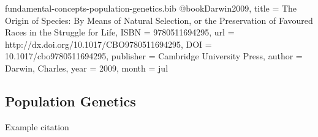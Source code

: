 \begin{bibunit}

\begin{filecontents*}[overwrite]{fundamental-concepts-population-genetics.bib}
@book{Darwin2009,
  title = {The Origin of Species: By Means of Natural Selection,  or the Preservation of Favoured Races in the Struggle for Life},
  ISBN = {9780511694295},
  url = {http://dx.doi.org/10.1017/CBO9780511694295},
  DOI = {10.1017/cbo9780511694295},
  publisher = {Cambridge University Press},
  author = {Darwin,  Charles},
  year = {2009},
  month = jul 
}
\end{filecontents*} 

\subsection{Population Genetics}
\label{sec:population-genetics}

Example citation \citep{Darwin2009}

    
\end{bibunit}
